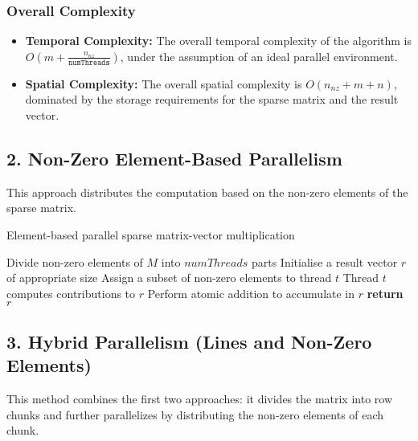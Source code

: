 \documentclass[12pt,oneside]{book} %
\begin{document}
\subsubsection{Overall Complexity}
\begin{itemize}
    \item \textbf{Temporal Complexity:} The overall temporal complexity of the algorithm is \(O(m + \frac{n_{nz}}{\texttt{numThreads}})\), under the assumption of an ideal parallel environment.
    
    \item \textbf{Spatial Complexity:} The overall spatial complexity is \(O(n_{nz} + m + n)\), dominated by the storage requirements for the sparse matrix and the result vector.
\end{itemize}


\subsection*{2. Non-Zero Element-Based Parallelism}

This approach distributes the computation based on the non-zero elements of the
sparse matrix.

\begin{algorithm}[H]
    \caption{Element-based parallel sparse matrix-vector multiplication}
    \begin{algorithmic}[1]
        \State Divide non-zero elements of $M$ into $numThreads$ parts
        \State Initialise a result vector $r$ of appropriate size
        \State Assign a subset of non-zero elements to thread $t$
        \State Thread $t$ computes contributions to $r$
        \State Perform atomic addition to accumulate in $r$
        \EndFor
        \State \textbf{return} $r$
        \EndProcedure
    \end{algorithmic}
\end{algorithm}

\subsection*{3. Hybrid Parallelism (Lines and Non-Zero Elements)}

This method combines the first two approaches: it divides the matrix into row
chunks and further parallelizes by distributing the non-zero elements of each
chunk.
\end{document}

